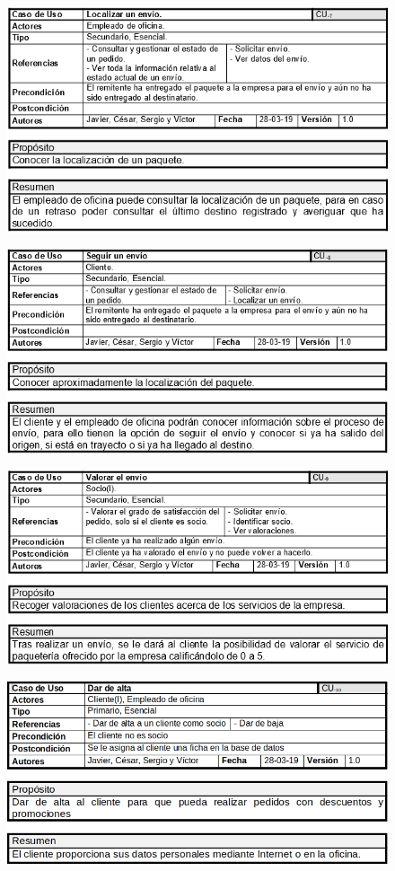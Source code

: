 \begin{figure}[H]
	\centering
	\includegraphics[width=16cm]{7}
\end{figure}
\begin{figure}[H]
	\centering
	\includegraphics[width=16cm]{8}
\end{figure}
\begin{figure}[H]
	\centering
	\includegraphics[width=16cm]{9}
\end{figure}
\begin{figure}[H]
	\centering
	\includegraphics[width=16cm]{10}
\end{figure}
